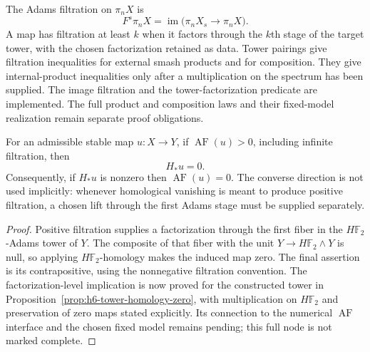 \begin{definition}
  \label{def:adams-tower-filtration}
  \notready
  The Adams filtration on $\pi_nX$ is
  \[
    F^s\pi_nX=\operatorname{im}\bigl(\pi_nX_s\longrightarrow\pi_nX\bigr).
  \]
  A map has filtration at least $k$ when it factors through the $k$th stage of
  the target tower, with the chosen factorization retained as data.  Tower
  pairings give filtration inequalities for external smash products and for
  composition.  They give internal-product inequalities only after a
  multiplication on the spectrum has been supplied.
  The image filtration and the tower-factorization predicate are
  implemented. The full product and composition laws and their fixed-model
  realization remain separate proof obligations.
\end{definition}

\begin{proposition}
  \label{prop:positive-adams-filtration-homology-zero}
  \notready
  For an admissible stable map $u:X\to Y$, if
  $\operatorname{AF}(u)>0$, including infinite filtration, then
  \[
    H_*u=0.
  \]
  Consequently, if $H_*u$ is nonzero then $\operatorname{AF}(u)=0$.  The
  converse direction is not used implicitly: whenever homological vanishing
  is meant to produce positive filtration, a chosen lift through the first
  Adams stage must be supplied separately.
\end{proposition}

\begin{proof}
  Positive filtration supplies a factorization through the first fiber in the
  $H\mathbb F_2$-Adams tower of $Y$.  The composite of that fiber with the
  unit $Y\to H\mathbb F_2\wedge Y$ is null, so applying
  $H\mathbb F_2$-homology makes the induced map zero.  The final assertion is
  its contrapositive, using the nonnegative filtration convention.
  The factorization-level implication is now proved for the constructed
  tower in Proposition~\ref{prop:h6-tower-homology-zero}, with multiplication
  on $H\mathbb F_2$ and preservation of zero maps stated explicitly.
  Its connection to the numerical $\operatorname{AF}$ interface and the
  chosen fixed model remains pending; this full node is not marked complete.
\end{proof}

